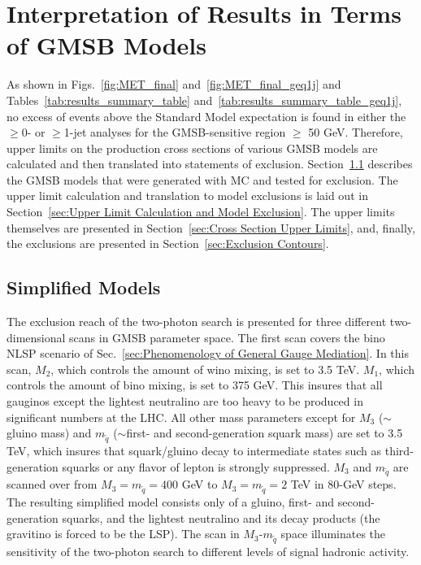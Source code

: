 \documentclass[dissertation.tex]{subfiles}
\begin{document}
\chapter{Interpretation of Results in Terms of GMSB Models}
\label{chap:Interpretation of Results in Terms of GMSB Models}

As shown in Figs.~\ref{fig:MET_final} and~\ref{fig:MET_final_geq1j} and Tables~\ref{tab:results_summary_table} and~\ref{tab:results_summary_table_geq1j}, no excess of events above the Standard Model expectation is found in either the $\geq$0- or $\geq$1-jet analyses for the GMSB-sensitive region \MET $\geq$ 50 GeV.  Therefore, upper limits on the production cross sections of various GMSB models are calculated and then translated into statements of exclusion.  Section~\ref{sec:Simplified Models} describes the GMSB models that were generated with MC and tested for exclusion.  The upper limit calculation and translation to model exclusions is laid out in Section~\ref{sec:Upper Limit Calculation and Model Exclusion}.  The upper limits themselves are presented in Section~\ref{sec:Cross Section Upper Limits}, and, finally, the exclusions are presented in Section~\ref{sec:Exclusion Contours}.

\section{Simplified Models}
\label{sec:Simplified Models}

The exclusion reach of the two-photon search is presented for three different two-dimensional scans in GMSB parameter space.  The first scan covers the bino NLSP scenario of Sec.~\ref{sec:Phenomenology of General Gauge Mediation}.  In this scan, $M_{2}$, which controls the amount of wino mixing, is set to 3.5 TeV.  $M_{1}$, which controls the amount of bino mixing, is set to 375 GeV.  This insures that all gauginos except the lightest neutralino are too heavy to be produced in significant numbers at the LHC.  All other mass parameters except for $M_{3}$ ($\sim$gluino mass) and $m_{\tilde{q}}$ ($\sim$first- and second-generation squark mass) are set to 3.5 TeV, which insures that squark/gluino decay to intermediate states such as third-generation squarks or any flavor of lepton is strongly suppressed.  $M_{3}$ and $m_{\tilde{q}}$ are scanned over from $M_{3} = m_{\tilde{q}} = 400$ GeV to $M_{3} = m_{\tilde{q}} = 2$ TeV in 80-GeV steps.  The resulting simplified model consists only of a gluino, first- and second-generation squarks, and the lightest neutralino and its decay products (the gravitino is forced to be the LSP).  The scan in $M_{3}$-$m_{\tilde{q}}$ space illuminates the sensitivity of the two-photon search to different levels of signal hadronic activity.
\end{document}

